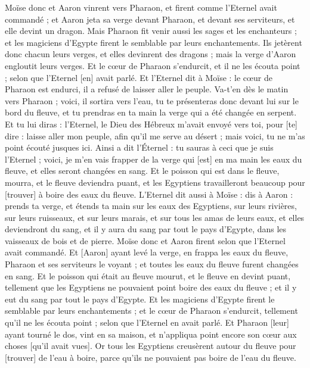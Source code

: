 \begin{multicols}{2}
Moïse donc et Aaron vinrent vers Pharaon, et firent comme l'Eternel avait commandé ; et Aaron jeta sa verge devant Pharaon, et devant ses serviteurs, et elle devint un dragon.
Mais Pharaon fit venir aussi les sages et les enchanteurs ; et les magiciens d'Egypte firent le semblable par leurs enchantements.
Ils jetèrent donc chacun leurs verges, et elles devinrent des dragons ; mais la verge d'Aaron engloutit leurs verges.
Et le cœur de Pharaon s'endurcit, et il ne les écouta point ; selon que l'Eternel [en] avait parlé.
Et l'Eternel dit à Moïse : le cœur de Pharaon est endurci, il a refusé de laisser aller le peuple.
Va-t'en dès le matin vers Pharaon ; voici, il sortira vers l'eau, tu te présenteras donc devant lui sur le bord du fleuve, et tu prendras en ta main la verge qui a été changée en serpent.
Et tu lui diras : l'Eternel, le Dieu des Hébreux m'avait envoyé vers toi, pour [te] dire : laisse aller mon peuple, afin qu'il me serve au désert ; mais voici, tu ne m'as point écouté jusques ici.
Ainsi a dit l'Éternel : tu sauras à ceci que je suis l'Eternel ; voici, je m'en vais frapper de la verge qui [est] en ma main les eaux du fleuve, et elles seront changées en sang.
Et le poisson qui est dans le fleuve, mourra, et le fleuve deviendra puant, et les Egyptiens travailleront beaucoup pour [trouver] à boire des eaux du fleuve.
L'Eternel dit aussi à Moïse : dis à Aaron : prends ta verge, et étends ta main sur les eaux des Egyptiens, sur leurs rivières, sur leurs ruisseaux, et sur leurs marais, et sur tous les amas de leurs eaux, et elles deviendront du sang, et il y aura du sang par tout le pays d'Egypte, dans les vaisseaux de bois et de pierre.
Moïse donc et Aaron firent selon que l'Eternel avait commandé. Et [Aaron] ayant levé la verge, en frappa les eaux du fleuve, Pharaon et ses serviteurs le voyant ; et toutes les eaux du fleuve furent changées en sang.
Et le poisson qui était au fleuve mourut, et le fleuve en devint puant, tellement que les Egyptiens ne pouvaient point boire des eaux du fleuve ; et il y eut du sang par tout le pays d'Egypte.
Et les magiciens d'Egypte firent le semblable par leurs enchantements ; et le cœur de Pharaon s'endurcit, tellement qu'il ne les écouta point ; selon que l'Eternel en avait parlé.
Et Pharaon [leur] ayant tourné le dos, vint en sa maison, et n'appliqua point encore son cœur aux choses [qu'il avait vues].
Or tous les Egyptiens creusèrent autour du fleuve pour [trouver] de l'eau à boire, parce qu'ils ne pouvaient pas boire de l'eau du fleuve.

\end{multicols}
